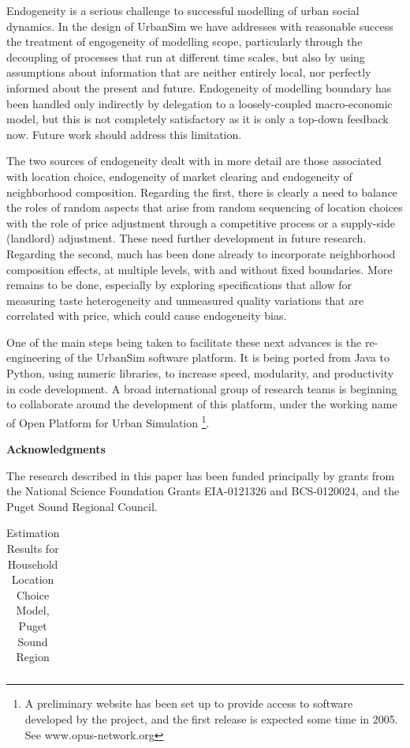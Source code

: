 \documentclass[12pt,a4paper]{article}
\begin{document}
Endogeneity is a serious challenge to successful modelling of
urban social dynamics.  In the design of UrbanSim we have
addresses with reasonable success the treatment of engogeneity of
modelling scope, particularly through the decoupling of processes
that run at different time scales, but also by using assumptions
about information that are neither entirely local, nor perfectly
informed about the present and future.  Endogeneity of modelling
boundary has been handled only indirectly by delegation to a
loosely-coupled macro-economic model, but this is not completely
satisfactory as it is only a top-down feedback now.  Future work
should address this limitation.

The two sources of endogeneity dealt with in more detail are those
associated with location choice, endogeneity of market clearing
and endogeneity of neighborhood composition. Regarding the first,
there is clearly a need to balance the roles of random aspects
that arise from random sequencing of location choices with the
role of price adjustment through a competitive process or a
supply-side (landlord) adjustment.  These need further development
in future research.  Regarding the second, much has been done
already to incorporate neighborhood composition effects, at
multiple levels, with and without fixed boundaries.  More remains
to be done, especially by exploring specifications that allow for
measuring taste heterogeneity and unmeasured quality variations
that are correlated with price, which could cause endogeneity
bias.

One of the main steps being taken to facilitate these next
advances is the re-engineering of the UrbanSim software platform.
It is being ported from Java to Python, using numeric libraries,
to increase speed, modularity, and productivity in code
development.  A broad international group of research teams is
beginning to collaborate around the development of this platform,
under the working name of Open Platform for Urban Simulation
\footnote{A preliminary website has been set up to provide access
to software developed by the project, and the first release is
expected some time in 2005.  See www.opus-network.org}.

\vspace{1cm} {\bf \large Acknowledgments}

The research described in this paper has been funded principally
by grants from the National Science Foundation Grants EIA-0121326
and BCS-0120024, and the Puget Sound Regional Council.

\clearpage
\begin{table}[h]
\caption{Estimation Results for Household Location Choice Model,
Puget Sound Region} \label{tab:hlc} \centering
\begin{tabular}{lrr|rr|rr}
\\

\end{tabular}

\end{table}
\clearpage








\end{document}
